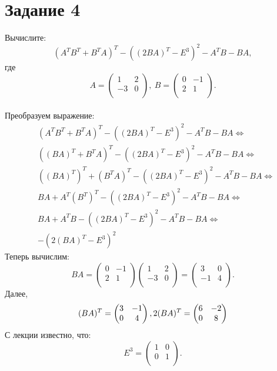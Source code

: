 \documentclass[a4paper,12pt]{article}
\begin{document}
\section*{Задание 4}
Вычислите:
\[
(A^TB^T + B^TA)^T - ((2BA)^T - E^3)^2 - A^T B - BA,
\]
где 
\[
A = \begin{pmatrix}
1 & 2\\
-3 & 0\\
\end{pmatrix},\
B = \begin{pmatrix}
0 & -1\\
2 & 1\\
\end{pmatrix}.
\]
\\ Преобразуем выражение:
\begin{align*}
&(A^TB^T + B^TA)^T - ((2BA)^T - E^3)^2 - A^T B - BA \Leftrightarrow \\
&((BA)^T+B^TA)^T-((2BA)^T-E^3)^2-A^TB-BA \Leftrightarrow \\
&((BA)^T)^T+(B^TA)^T-((2BA)^T-E^3)^2-A^TB-BA \Leftrightarrow \\
&BA+A^T(B^T)^T-((2BA)^T-E^3)^2-A^TB-BA \Leftrightarrow \\
&BA+A^TB-((2BA)^T-E^3)^2-A^TB-BA \Leftrightarrow \\
&-(2(BA)^T-E^3)^2
\end{align*}
Теперь вычислим:
$$ BA = 
\begin{pmatrix}
0 & -1\\
2 & 1\\
\end{pmatrix}
\begin{pmatrix}
1 & 2\\
-3 & 0\\
\end{pmatrix}
=
\begin{pmatrix}
3 & 0\\
-1 & 4\\
\end{pmatrix}. $$
Далее,
$$ (BA)^T=
\begin{pmatrix}
3 & -1\\
0 & 4\\
\end{pmatrix}, \\
 2(BA)^T =
\begin{pmatrix}
6 & -2\\
0 & 8\\
\end{pmatrix}$$
С лекции известно, что:
$$E^3 = 
\begin{pmatrix}
1 & 0\\
0 & 1\\
\end{pmatrix}.$$
\end{document}
